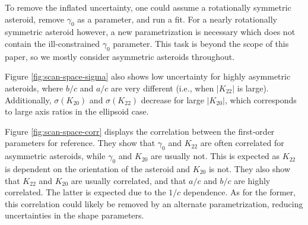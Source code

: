 \documentclass[fleqn,usenatbib]{mnras}
\begin{document}
To remove the inflated uncertainty, one could assume a rotationally symmetric asteroid, remove $\gamma_0$ as a parameter, and run a fit. For a nearly rotationally symmetric asteroid however, a new parametrization is necessary which does not contain the ill-constrained $\gamma_0$ parameter. This task is beyond the scope of this paper, so we mostly consider asymmetric asteroids throughout.

Figure \ref{fig:scan-space-sigma} also shows low uncertainty for highly asymmetric asteroids, where $b/c$ and $a/c$ are very different (i.e., when $|K_{22}|$ is large). Additionally, $\sigma(K_{20})$ and $\sigma(K_{22})$ decrease for large $|K_{20}|$, which corresponds to large axis ratios in the ellipsoid case.

Figure \ref{fig:scan-space-corr} displays the correlation between the first-order parameters for reference. They show that $\gamma_0$ and $K_{22}$ are often correlated for asymmetric asteroids, while $\gamma_0$ and $K_{20}$ are usually not. This is expected as $K_{22}$ is dependent on the orientation of the asteroid and $K_{20}$ is not. They also show that $K_{22}$ and $K_{20}$ are usually correlated, and that $a/c$ and $b/c$ are highly correlated. The latter is expected due to the $1/c$ dependence. As for the former, this correlation could likely be removed by an alternate parametrization, reducing uncertainties in the shape parameters.
\end{document}
